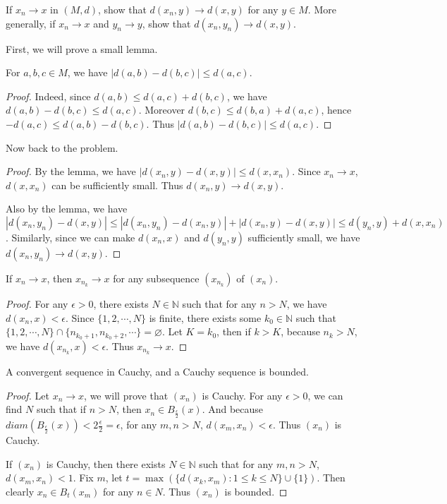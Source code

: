 \documentclass[12pt, a4paper]{article}
\theoremstyle{plain}
\newcommand{\N}{\mathbb{N}}
\begin{document}
\begin{exercise}{34}
If $x_n\rightarrow x$ in $(M,d)$, show that $d(x_n,y)\rightarrow d(x,y)$ for any $y\in M$. More generally, if $x_n\rightarrow x$ and $y_n\rightarrow y$, show that $d(x_n,y_n)\rightarrow d(x,y)$.
\end{exercise}
	First, we will prove a small lemma.
	\begin{lemma}
	
	For $a,b,c\in M$, we have $|d(a,b)-d(b,c)|\leq d(a,c)$.
	\end{lemma}
	\begin{proof}
	Indeed, since $d(a,b)\leq d(a,c)+d(b,c)$, we have $d(a,b)-d(b,c)\leq d(a,c)$. Moreover $d(b,c)\leq d(b,a)+d(a,c)$, hence $-d(a,c)\leq d(a,b)-d(b,c)$. Thus $|d(a,b)-d(b,c)|\leq d(a,c)$.
	\end{proof}
	Now back to the problem.
	\begin{proof}
	By the lemma, we have $|d(x_n,y)-d(x,y)|\leq d(x,x_n)$. Since $x_n\rightarrow x$, $d(x,x_n)$ can be sufficiently small. Thus $d(x_n,y)\rightarrow d(x,y)$. 
	
	Also by the lemma, we have $|d(x_n,y_n)-d(x,y)|\leq |d(x_n,y_n)-d(x_n,y)|+|d(x_n,y)-d(x,y)|\leq d(y_n,y)+d(x,x_n)$. Similarly, since we can make $d(x_n,x)$ and $d(y_n,y)$ sufficiently small, we have $d(x_n,y_n)\rightarrow d(x,y)$.
	\end{proof}

\begin{exercise}{35}
If $x_n\rightarrow x$, then $x_{n_k}\rightarrow x$ for any subsequence $(x_{n_k})$ of $(x_n)$.
\end{exercise}
	\begin{proof}
	For any $\epsilon >0$, there exists $N\in \N$ such that for any $n>N$, we have $d(x_n,x)<\epsilon$. Since $\{1,2,\cdots ,N\}$ is finite, there exists some $k_0\in\N$ such that $\{1,2,\cdots ,N\}\cap\{n_{k_0+1},n_{k_0+2},\cdots\}=\varnothing$. Let $K=k_0$, then if $k>K$, because $n_k>N$, we have $d(x_{n_k},x)<\epsilon$. Thus $x_{n_k}\rightarrow x$.
	\end{proof}

\begin{exercise}{36}
A convergent sequence in Cauchy, and a Cauchy sequence is bounded.
\end{exercise}
	\begin{proof}
	Let $x_n\rightarrow x$, we will prove that $(x_n)$ is Cauchy. For any $\epsilon >0$, we can find $N$ such that if $n>N$, then $x_n\in B_\frac{\epsilon}{2}(x)$. And because $diam(B_\frac{\epsilon}{2}(x))<2\frac{\epsilon}{2}=\epsilon$, for any $m,n>N$, $d(x_m,x_n)<\epsilon$. Thus $(x_n)$ is Cauchy.
	
	If $(x_n)$ is Cauchy, then there exists $N\in \N$ such that for any $m,n>N$, $d(x_m,x_n)<1$. Fix $m$, let $t=\max(\{d(x_k,x_m):1\leq k\leq N\}\cup \{1\})$. Then clearly $x_n\in B_t(x_m)$ for any $n\in N$. Thus $(x_n)$ is bounded.
	\end{proof}
\end{document}
